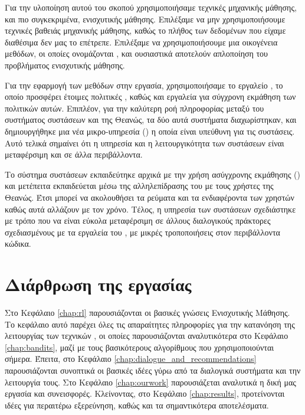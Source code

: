 Για την υλοποίηση αυτού του σκοπού χρησιμοποιήσαμε τεχνικές μηχανικής μάθησης, και πιο συγκεκριμένα, ενισχυτικής μάθησης. Επιλέξαμε να μην χρησιμοποιήσουμε
τεχνικές βαθειάς μηχανικής μάθησης, καθώς το πλήθος των δεδομένων που είχαμε διαθέσιμα δεν μας το επέτρεπε. Επιλέξαμε να χρησιμοποιήσουμε
μια οικογένεια μεθόδων, οι οποίες ονομάζονται , και ουσιαστικά αποτελούν απλοποίηση του προβλήματος ενισχυτικής μάθησης.

Για την εφαρμογή των μεθόδων  στην εργασία, χρησιμοποιήσαμε το εργαλείο , το οποίο προσφέρει έτοιμες πολιτικές ,
καθώς και εργαλεία για σύγχρονη εκμάθηση των πολιτικών αυτών. Επιπλέον, για την καλύτερη ροή πληροφορίας μεταξύ του συστήματος συστάσεων και της Θεανώς, τα δύο αυτά συστήματα
διαχωρίστηκαν, και δημιουργήθηκε μια νέα μικρο-υπηρεσία () η οποία είναι υπεύθυνη για τις συστάσεις. Αυτό τελικά σημαίνει ότι η υπηρεσία
και η λειτουργικότητα των συστάσεων είναι μεταφέρσιμη και σε άλλα περιβάλλοντα.

Το σύστημα συστάσεων εκπαιδεύτηκε αρχικά με την χρήση ασύγχρονης εκμάθησης () και μετέπειτα εκπαιδεύεται μέσω της αλληλεπίδρασης του
με τους χρήστες της Θεανώς. Έτσι μπορεί να ακολουθήσει τα ρεύματα και τα ενδιαφέροντα των χρηστών καθώς αυτά αλλάζουν με τον χρόνο.
Τέλος, η υπηρεσία των συστάσεων σχεδιάστηκε με τρόπο που να είναι εύκολα μεταφέρσιμη σε άλλους διαλογικούς πράκτορες σχεδιασμένους με τα εργαλεία του
, με μικρές τροποποιήσεις στον περιβάλλοντα κώδικα.

\section{Διάρθρωση της εργασίας}

Στο Κεφάλαιο \ref{chap:rl} παρουσιάζονται οι βασικές γνώσεις Ενισχυτικής Μάθησης. Το κεφάλαιο αυτό παρέχει όλες τις απαραίτητες πληροφορίες για την κατανόηση της
λειτουργίας των τεχνικών , οι οποίες παρουσιάζονται αναλυτικότερα στο Κεφάλαιο \ref{chap:bandits}, μαζί με τους βασικότερους αλγορίθμους που χρησιμοποιούνται σήμερα.
Έπειτα, στο Κεφάλαιο \ref{chap:dialogue_and_recommendations} παρουσιάζονται συνοπτικά οι βασικές ιδέες γύρω από τα διαλογικά συστήματα και την λειτουργία τους. Στο Κεφάλαιο \ref{chap:ourwork}
παρουσιάζεται αναλυτικά η δική μας εργασία και συνεισφορές. Κλείνοντας, στο Κεφάλαιο \ref{chap:results}, προτείνονται ιδέες για περαιτέρω εξερεύνηση, καθώς και τα σημαντικότερα αποτελέσματα.
